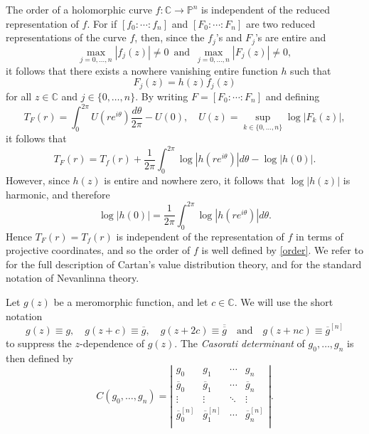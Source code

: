 \documentclass{amsart}
\newcommand{\C}{\mathbb{C}}
\renewcommand{\P}{\mathbb{P}}
\theoremstyle{definition}
\numberwithin{equation}{section}
\numberwithin{theorem}{section}
\begin{document}
The order of a holomorphic curve $f:\C\to\P^n$ is independent of the
reduced representation of $f$. For if $[f_0:\cdots:f_n]$ and
$[F_0:\cdots:F_n]$ are two reduced representations of the curve
$f$, then, since the $f_j$'s and $F_j$'s are entire and
    \begin{equation*}
    \max_{j=0,\ldots,n}|f_j(z)|\not=0 \,\textrm{ and }\,
    \max_{j=0,\ldots,n}|F_j(z)|\not=0,
    \end{equation*}
it follows that there exists a nowhere vanishing entire function
$h$ such that
    \begin{equation*}
    F_j(z)=h(z)f_j(z)
    \end{equation*}
for all $z\in\C$ and $j\in\{0,\ldots,n\}$. By writing
$F=[F_0:\cdots:F_n]$ and defining
    \begin{equation*}
    T_F(r)=\int_0^{2\pi}U(re^{i\theta})\frac{d\theta}{2\pi}-U(0),
    \quad U(z)=\sup_{k\in \{0,\ldots,n\}} \log|F_k(z)|,
    \end{equation*}
it follows that
    \begin{equation*}
    T_F(r)=T_f(r)+\frac{1}{2\pi}\int_0^{2\pi}\log|h(re^{i\theta})|d\theta-\log|h(0)|.
    \end{equation*}
However, since $h(z)$ is entire and nowhere zero, it follows that
$\log|h(z)|$ is harmonic, and therefore
    \begin{equation*}
    \log|h(0)|=\frac{1}{2\pi}\int_0^{2\pi}\log|h(re^{i\theta})|d\theta.
    \end{equation*}
Hence $T_F(r)=T_f(r)$ is independent of the representation of $f$
in terms of projective coordinates, and so the order of $f$ is
well defined by \eqref{order}. We refer to \cite{lang:87} for the
full description of Cartan's value distribution theory, and
\cite{cherryy:01,hayman:64,yang:93} for the standard notation of
Nevanlinna theory.

Let $g(z)$ be a meromorphic function, and let $c\in\C$. We will
use the short notation
    \begin{equation*}
    g(z)\equiv g, \quad g(z+c)\equiv \overline{g},\quad g(z+2c)\equiv
    \overline{\overline{g}}\quad \textrm{and} \quad g(z+nc)\equiv
    \overline{g}^{[n]}
    \end{equation*}
to suppress the $z$-dependence of $g(z)$. The \textit{Casorati
determinant} of $g_0,\ldots,g_n$ is then defined by
    \begin{equation*}
    C(g_0,\ldots,g_n)=\left|\begin{array}{ccccc}
      g_0 & g_1 & \cdots & g_n \\
      \overline{g}_0 & \overline{g}_1 & \cdots & \overline{g}_n \\
      \vdots & \vdots & \ddots & \vdots \\
      \overline{g}^{[n]}_0 & \overline{g}^{[n]}_1 &  \cdots & \overline{g}^{[n]}_n \\
    \end{array}\right|.
    \end{equation*}
\end{document}
